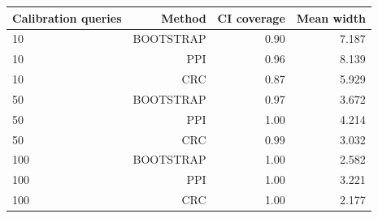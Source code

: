 \begin{tabular}{@{}lrrr@{}}
\toprule
Calibration queries & Method & CI coverage & Mean width \\
\midrule
10 & BOOTSTRAP & 0.90 & 7.187 \\
10 & PPI & 0.96 & 8.139 \\
10 & CRC & 0.87 & 5.929 \\
50 & BOOTSTRAP & 0.97 & 3.672 \\
50 & PPI & 1.00 & 4.214 \\
50 & CRC & 0.99 & 3.032 \\
100 & BOOTSTRAP & 1.00 & 2.582 \\
100 & PPI & 1.00 & 3.221 \\
100 & CRC & 1.00 & 2.177 \\
\bottomrule
\end{tabular}
